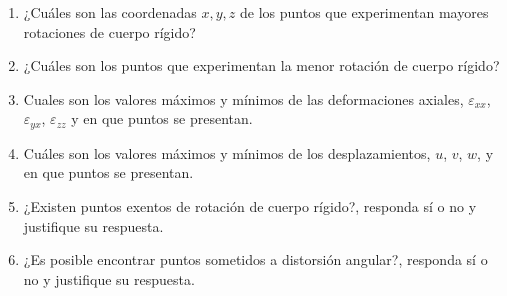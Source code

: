 \documentclass[../notas medios.tex]{subfiles}
\begin{document}
\begin{enumerate}
\begin{enumerate}
\item¿Cu\'ales son las coordenadas $x,y,z$ de los puntos que experimentan mayores rotaciones de cuerpo r\'igido?
\item ¿Cu\'ales son los puntos que experimentan la menor rotaci\'on de cuerpo r\'igido? 
\item Cuales son los valores m\'aximos y m\'inimos de las deformaciones axiales, $\varepsilon_{xx}$, $\varepsilon_{yx}$, $\varepsilon_{zz}$ y en que puntos se presentan.
\item Cu\'ales son los valores m\'aximos y m\'inimos de los desplazamientos, $u$, $v$, $w$, y en que puntos se presentan.
\item ¿Existen puntos exentos de rotaci\'on de cuerpo r\'igido?, responda s\'i o no y justifique su respuesta.
\item ¿Es posible encontrar puntos sometidos a distorsi\'on angular?, responda s\'i o no y justifique su respuesta.
%
\end{enumerate}
%
\newpage


\end{enumerate}
\end{document}
